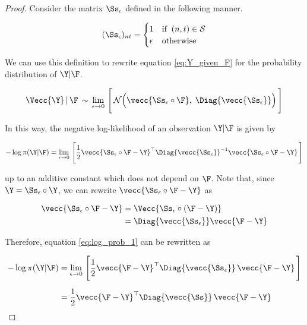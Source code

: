\begin{proof}
    Consider the matrix $\Ss_{\epsilon}$ defined in the following manner. 
    
    \begin{equation}
        (\Ss_{\epsilon})_{nt} = \begin{cases}
            1 & \text{if} \;\; (n, t) \in \mathcal{S} \\
            \epsilon & \text{otherwise}
        \end{cases}
    \end{equation}

    We can use this definition to rewrite equation \ref{eq:Y_given_F} for the probability distribution of $\Y | \F$.

    \begin{equation}
        \Vecc{\Y} \, | \, \F \, \sim \, \lim_{\epsilon \rightarrow 0} \, \Bigg[ \, \mathcal{N}\Big(\vecc{\Ss_{\epsilon} \circ \F}, \; \Diag{\vecc{\Ss_{\epsilon}}}\Big) \, \Bigg]
    \end{equation}

    In this way, the negative log-likelihood of an observation $\Y | \F$ is given by 

    \begin{equation}
        \label{eq:log_prob_1}
        - \log \pi(\Y | \F) = \lim_{\epsilon \rightarrow 0} \, \Bigg[  \frac{1}{2} \vecc{\Ss_{\epsilon} \circ \F - \Y}^\top \Diag{\vecc{\Ss_{\epsilon}}}^{-1} \vecc{\Ss_{\epsilon} \circ \F - \Y}\, \Bigg]
    \end{equation}

    up to an additive constant which does not depend on $\F$. Note that, since $\Y = \Ss_{\epsilon}  \circ \Y$, we can rewrite $\vecc{\Ss_{\epsilon} \circ \F - \Y}$ as 

    \begin{align}
        \vecc{\Ss_{\epsilon} \circ \F - \Y} &= \Vecc{\Ss_{\epsilon} \circ  (\F - \Y)}  \notag \\
        &= \Diag{\vecc{\Ss_{\epsilon}}} \vecc{\F - \Y}
    \end{align}

    Therefore, equation \ref{eq:log_prob_1} can be rewritten as 

    \begin{align}
        - \log \pi(\Y | \F) &= \lim_{\epsilon \rightarrow 0} \, \Bigg[  \frac{1}{2} \vecc{\F - \Y}^\top \Diag{\vecc{\Ss_{\epsilon}}} \, \vecc{\F - \Y}\, \Bigg] \notag \\[0.2cm]
        &= \frac{1}{2} \vecc{\F - \Y}^\top \Diag{\vecc{\Ss}} \, \vecc{\F - \Y}
    \end{align}


\end{proof}
